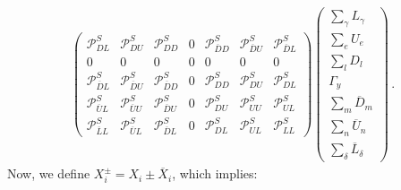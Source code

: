 \documentclass[10pt,a4paper]{article}
\begin{document}
\begin{equation}
\begin{array}{rcl}
\begin{pmatrix}
\mathcal{P}^S_{DL} & \mathcal{P}^S_{DU} & \mathcal{P}^S_{DD} & 0 & \mathcal{P}^S_{\overline{D}D} & \mathcal{P}^S_{\overline{D}U} & \mathcal{P}^S_{\overline{D}L} \\ 
0 & 0 & 0 & 0 & 0 & 0 & 0\\
\mathcal{P}^S_{\overline{D}L} & \mathcal{P}^S_{\overline{D}U} & \mathcal{P}^S_{\overline{D}D} & 0 & \mathcal{P}^S_{DD} & \mathcal{P}^S_{DU} & \mathcal{P}^S_{DL}\\
\mathcal{P}^S_{\overline{U}L} & \mathcal{P}^S_{\overline{U}U} & \mathcal{P}^S_{\overline{D}U} & 0 & \mathcal{P}^S_{DU} & \mathcal{P}^S_{UU} & \mathcal{P}^S_{UL}\\
\mathcal{P}^S_{\overline{L}L} & \mathcal{P}^S_{\overline{U}L} &\mathcal{P}^S_{\overline{D}L} & 0 & \mathcal{P}^S_{DL} & \mathcal{P}^S_{UL} & \mathcal{P}^S_{LL}
\end{pmatrix}
\begin{pmatrix}
\sum_\gamma L_\gamma\\
\sum_e U_e \\
\sum_l D_l\\
\Gamma_y\\
\sum_m \overline{D}_m\\
\sum_n \overline{U}_n\\
\sum_\delta \overline{L}_\delta
\end{pmatrix}\,.
\end{array}
\end{equation}
Now, we define $X_i^\pm=X_i\pm\overline{X}_i$, which implies:
\end{document}

